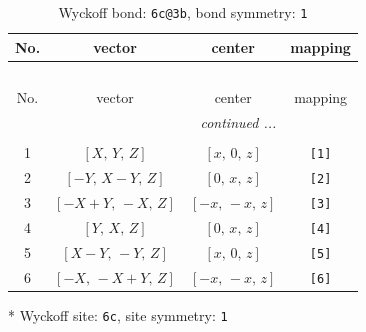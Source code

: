 \documentclass[fleqn,8pt]{jsarticle}
\begin{document}
\renewcommand{\arraystretch}{1.2}
\begin{longtable}{cccc}
\caption{Wyckoff bond: {\tt 6c@3b}, bond symmetry: {\tt 1}}
 \\
 \hline \hline
No. & vector & center & mapping \\ \hline \endfirsthead

\multicolumn{3}{l}{\tablename\ \thetable{}} \\
 \hline \hline
No. & vector & center & mapping \\ \hline \endhead

 \hline \hline
\multicolumn{3}{r}{\footnotesize\it continued ...} \\ \endfoot

 \hline \hline
\multicolumn{3}{r}{} \\ \endlastfoot

1 & $\left[ X,\, Y,\, Z \right]$ & $\left[ x,\, 0,\, z \right]$ & {\tt [1]} \\ \hline
2 & $\left[ - Y,\, X - Y,\, Z \right]$ & $\left[ 0,\, x,\, z \right]$ & {\tt [2]} \\ \hline
3 & $\left[ - X + Y,\, - X,\, Z \right]$ & $\left[ - x,\, - x,\, z \right]$ & {\tt [3]} \\ \hline
4 & $\left[ Y,\, X,\, Z \right]$ & $\left[ 0,\, x,\, z \right]$ & {\tt [4]} \\ \hline
5 & $\left[ X - Y,\, - Y,\, Z \right]$ & $\left[ x,\, 0,\, z \right]$ & {\tt [5]} \\ \hline
6 & $\left[ - X,\, - X + Y,\, Z \right]$ & $\left[ - x,\, - x,\, z \right]$ & {\tt [6]} \\
\end{longtable}
* Wyckoff site: {\tt 6c}, site symmetry: {\tt 1}
\renewcommand{\arraystretch}{1.2}
\end{document}
